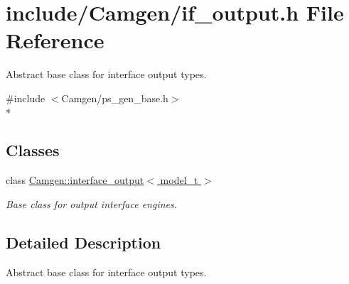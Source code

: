 \hypertarget{a00668}{}\section{include/\+Camgen/if\+\_\+output.h File Reference}
\label{a00668}


Abstract base class for interface output types.  


{\ttfamily \#include $<$Camgen/ps\+\_\+gen\+\_\+base.\+h$>$}\\*
\subsection*{Classes}
\begin{DoxyCompactItemize}
\item 
class \hyperlink{a00319}{Camgen\+::interface\+\_\+output$<$ model\+\_\+t $>$}
\begin{DoxyCompactList}\small\item\em Base class for output interface engines. \end{DoxyCompactList}\end{DoxyCompactItemize}


\subsection{Detailed Description}
Abstract base class for interface output types. 


